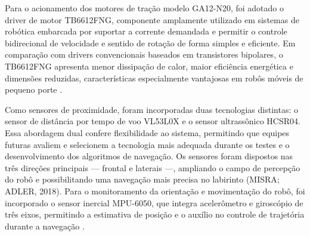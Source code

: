 \begin{center}
\end{center}

Para o acionamento dos motores de tração modelo GA12-N20, foi adotado o driver 
de motor TB6612FNG, componente amplamente utilizado em sistemas de robótica 
embarcada por suportar a corrente demandada e permitir o controle bidirecional 
de velocidade e sentido de rotação de forma simples e eficiente. Em comparação 
com drivers convencionais baseados em transistores bipolares, o TB6612FNG 
apresenta menor dissipação de calor, maior eficiência energética e dimensões 
reduzidas, características especialmente vantajosas em robôs móveis de pequeno 
porte \cite{misra2018}.

Como sensores de proximidade, foram incorporadas duas tecnologias distintas: o 
sensor de distância por tempo de voo VL53L0X e o sensor ultrassônico HCSR04. 
Essa abordagem dual confere flexibilidade ao sistema, permitindo que equipes 
futuras avaliem e selecionem a tecnologia mais adequada durante os testes e o 
desenvolvimento dos algoritmos de navegação. Os sensores foram dispostos nas 
três direções principais — frontal e laterais —, ampliando o campo de percepção 
do robô e possibilitando uma navegação mais precisa no labirinto (MISRA; ADLER, 
2018). Para o monitoramento da orientação e movimentação do robô, foi 
incorporado o sensor inercial MPU-6050, que integra acelerômetro e giroscópio de 
três eixos, permitindo a estimativa de posição e o auxílio no controle de trajetória 
durante a navegação \cite{feitosa2025}.

